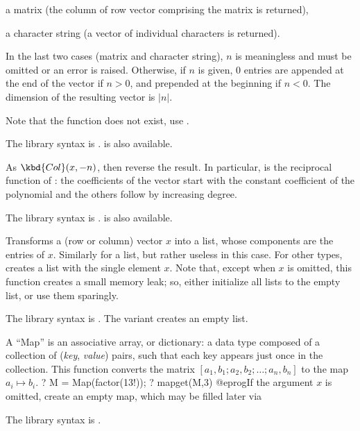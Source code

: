 \item a matrix (the column of row vector comprising the matrix is returned),

\item a character string (a vector of individual characters is returned).

In the last two cases (matrix and character string), $n$ is meaningless and
must be omitted or an error is raised. Otherwise, if $n$ is given, $0$
entries are appended at the end of the vector if $n > 0$, and prepended at
the beginning if $n < 0$. The dimension of the resulting vector is $|n|$.

Note that the function  does not exist, use .

The library syntax is .
 is also available.

\label{se:Colrev}
As $\kbd{Col}(x, -n)$, then reverse the result. In particular,
 is the reciprocal function of : the
coefficients of the vector start with the constant coefficient of the
polynomial and the others follow by increasing degree.

The library syntax is .
 is also available.

\label{se:List}
Transforms a (row or column) vector $x$ into a list, whose components are
the entries of $x$. Similarly for a list, but rather useless in this case.
For other types, creates a list with the single element $x$. Note that,
except when $x$ is omitted, this function creates a small memory leak; so,
either initialize all lists to the empty list, or use them sparingly.

The library syntax is .
The variant  creates an empty list.

\label{se:Map}
A ``Map'' is an associative array, or dictionary: a data
type composed of a collection of (\emph{key}, \emph{value}) pairs, such that
each key appears just once in the collection. This function
converts the matrix $[a_1,b_1;a_2,b_2;\dots;a_n,b_n]$ to the map $a_i\mapsto
b_i$.
\bprog
? M = Map(factor(13!));
? mapget(M,3)
@eprog\noindent If the argument $x$ is omitted, create an empty map, which
may be filled later via 

The library syntax is .

